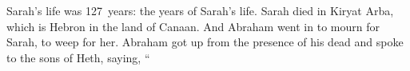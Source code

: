 
\begin{inparaenum}
     Sarah's life was 127~years: the years of Sarah's life.%
     Sarah died in Kiryat Arba, which is Hebron in the land of Canaan. And Abraham went in to mourn for Sarah, to weep for her.%
     Abraham got up from the presence of his dead and spoke to the sons of Heth, saying,%
     ``%
\end{inparaenum}
